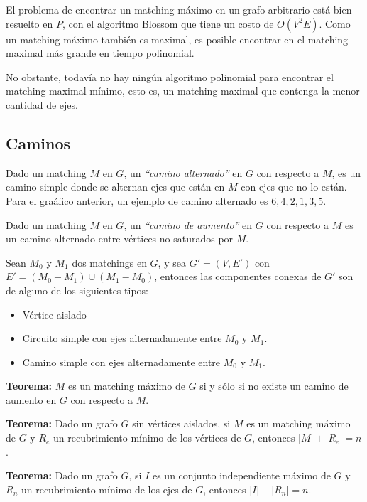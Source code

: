El problema de encontrar un matching m\'aximo en un grafo arbitrario est\'a bien resuelto en $P$, con el algoritmo Blossom que tiene un costo de $O(V^{2}E)$. Como un matching m\'aximo tambi\'en es maximal, es posible encontrar en el matching maximal m\'as grande en tiempo polinomial.

No obstante, todav\'ia no hay ning\'un algoritmo polinomial para encontrar el matching maximal m\'inimo, esto es, un matching maximal que contenga la menor cantidad de ejes.

\newpage
\subsection{Caminos}

Dado un matching $M$ en $G$, un \emph{``camino alternado''} en $G$ con respecto a $M$, es un camino simple donde se alternan ejes que est\'an en $M$ con ejes que no lo est\'an. Para el gra\'afico anterior, un ejemplo de camino alternado es $6,4,2,1,3,5$.

Dado un matching $M$ en $G$, un \emph{``camino de aumento''} en $G$ con respecto a $M$ es un camino alternado entre v\'ertices no saturados por $M$.

Sean $M_0$ y $M_1$ dos matchings en $G$, y sea $G' = (V, E')$ con $E' = (M_0 - M_1) \cup (M_1 - M_0)$, entonces las componentes conexas de $G'$ son de alguno de los siguientes tipos:

\begin{itemize}
\item V\'ertice aislado
\item Circuito simple con ejes alternadamente entre $M_0$ y $M_1$.
\item Camino simple con ejes alternadamente entre $M_0$ y $M_1$.
\end{itemize}

\textbf{Teorema:} $M$ es un matching m\'aximo de $G$ si y s\'olo si no existe un camino de aumento en $G$ con respecto a $M$.

\textbf{Teorema:} Dado un grafo $G$ sin v\'ertices aislados, si $M$ es un matching m\'aximo de $G$ y $R_e$ un recubrimiento m\'inimo de los v\'ertices de $G$, entonces $|M| + |R_e| = n$.

\textbf{Teorema:} Dado un grafo $G$, si $I$ es un conjunto independiente m\'aximo de $G$ y $R_n$ un recubrimiento m\'inimo de los ejes de $G$, entonces $|I| + |R_n| = n$.